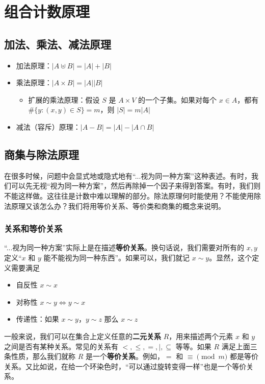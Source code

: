 \section{组合计数原理}

\subsection{加法、乘法、减法原理}
    \begin{itemize}
        \item 加法原理：$|A\uplus B|=|A|+|B|$
        \item 乘法原理：$|A\times B|=|A||B|$
        \begin{itemize}
            \item 扩展的乘法原理：假设 $S$ 是 $A\times V$ 的一个子集。如果对每个 $x\in A$，都有 $\#\{y:(x,y)\in S\}=m$，则 $|S|=m|A|$
        \end{itemize}
        \item 减法（容斥）原理：$|A-B|=|A|-|A\cap B|$
    \end{itemize}

\subsection{商集与除法原理}
    在很多时候，问题中会显式地或隐式地有“...视为同一种方案”这种表述。有时，我们可以先无视“视为同一种方案”，然后再除掉一个因子来得到答案。有时，我们则不能这样做。这往往是计数中难以理解的部分。除法原理何时能使用？不能使用除法原理又该怎么办？我们将用等价关系、等价类和商集的概念来说明。

    \subsubsection{关系和等价关系}
    “...视为同一种方案”实际上是在描述\textbf{等价关系}。换句话说，我们需要对所有的 $x,y$ 定义“$x$ 和 $y$ 能不能视为同一种东西”。如果可以，我们就记 $x\sim y$。显然，这个定义需要满足
    \begin{itemize}
        \item 自反性 $x\sim x$
        \item 对称性 $x\sim y\Longleftrightarrow y\sim x$
        \item 传递性：如果 $x\sim y$，$y\sim z$ 那么 $x\sim z$
    \end{itemize}

    一般来说，我们可以在集合上定义任意的\textbf{二元关系} $R$，用来描述两个元素 $x$ 和 $y$ 之间是否有某种关系。常见的关系有 $<,\le ,=,|,\subseteq$ 等等。如果 $R$ 满足上面三条性质，那么我们就称 $R$ 是一个\textbf{等价关系}。例如，$=$ 和 $\equiv \pmod m$ 都是等价关系。又比如说，在给一个环染色时，“可以通过旋转变得一样”也是一个等价关系。

